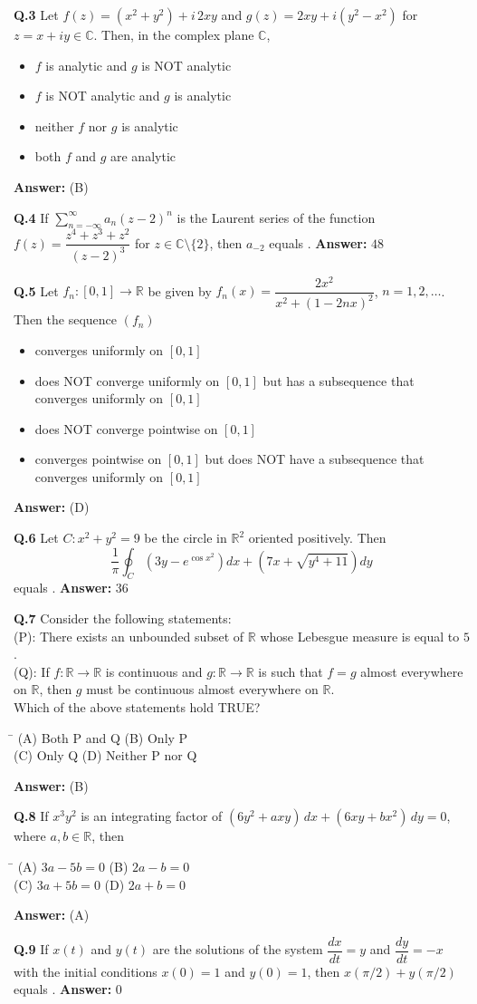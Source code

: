 \documentclass[11pt,a4paper]{article}
\newcommand{\optsfourA}[4]{%
  \begin{tabbing}
    \hspace{0.48\linewidth}\=\kill
    (A) #1 \> (B) #2 \\[2pt]
    (C) #3 \> (D) #4
  \end{tabbing}%
}
\newcommand{\optslistA}[4]{%
  \begin{itemize}
    \setlength{\itemsep}{2pt}\setlength{\parskip}{0pt}
    \item[(A)] #1
    \item[(B)] #2
    \item[(C)] #3
    \item[(D)] #4
  \end{itemize}%
}
\newcommand{\ans}[1]{\textbf{Answer:} #1\par\medskip}
\begin{document}
\textbf{Q.3} Let $f(z) = (x^2 + y^2) + i\,2xy$ and $g(z) = 2xy + i(y^2 - x^2)$ for $z = x + iy \in \mathbb{C}$. Then, in the complex plane $\mathbb{C}$,
\optslistA{$f$ is analytic and $g$ is NOT analytic}{$f$ is NOT analytic and $g$ is analytic}{neither $f$ nor $g$ is analytic}{both $f$ and $g$ are analytic}
\ans{(B)}

\textbf{Q.4} If $\displaystyle\sum_{n=-\infty}^{\infty} a_n (z - 2)^n$ is the Laurent series of the function $f(z) = \dfrac{z^4 + z^3 + z^2}{(z - 2)^3}$ for $z \in \mathbb{C} \setminus \{2\}$, then $a_{-2}$ equals \underline{\hspace{2cm}}.
\ans{$48$}

\textbf{Q.5} Let $f_n : [0, 1] \to \mathbb{R}$ be given by $f_n(x) = \dfrac{2x^2}{x^2 + (1 - 2nx)^2}$, $n = 1, 2, \dots$. Then the sequence $(f_n)$
\optslistA{converges uniformly on $[0, 1]$}{does NOT converge uniformly on $[0, 1]$ but has a subsequence that converges uniformly on $[0, 1]$}{does NOT converge pointwise on $[0, 1]$}{converges pointwise on $[0, 1]$ but does NOT have a subsequence that converges uniformly on $[0, 1]$}
\ans{(D)}

\textbf{Q.6} Let $C : x^2 + y^2 = 9$ be the circle in $\mathbb{R}^2$ oriented positively. Then
\[
  \frac{1}{\pi} \oint_C \left(3y - e^{\cos x^2}\right) dx + \left(7x + \sqrt{y^4 + 11}\right) dy
\]
equals \underline{\hspace{2cm}}.
\ans{$36$}

\textbf{Q.7} Consider the following statements:\\
(P): There exists an unbounded subset of $\mathbb{R}$ whose Lebesgue measure is equal to $5$.\\
(Q): If $f : \mathbb{R} \to \mathbb{R}$ is continuous and $g : \mathbb{R} \to \mathbb{R}$ is such that $f = g$ almost everywhere on $\mathbb{R}$, then $g$ must be continuous almost everywhere on $\mathbb{R}$.\\
Which of the above statements hold TRUE?
\optsfourA{Both P and Q}{Only P}{Only Q}{Neither P nor Q}
\ans{(B)}

\textbf{Q.8} If $x^3 y^2$ is an integrating factor of $(6y^2 + axy)\,dx + (6xy + bx^2)\,dy = 0$, where $a, b \in \mathbb{R}$, then
\optsfourA{$3a - 5b = 0$}{$2a - b = 0$}{$3a + 5b = 0$}{$2a + b = 0$}
\ans{(A)}

\textbf{Q.9} If $x(t)$ and $y(t)$ are the solutions of the system $\dfrac{dx}{dt} = y$ and $\dfrac{dy}{dt} = -x$ with the initial conditions $x(0) = 1$ and $y(0) = 1$, then $x(\pi/2) + y(\pi/2)$ equals \underline{\hspace{2cm}}.
\ans{$0$}
\end{document}
